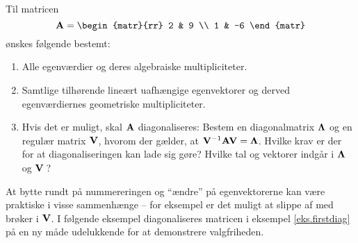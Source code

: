 \begin{exercise}
Til matricen
\begin{equation}
\mA = \begin{matr}{rr} 2 & 9 \\ 1 & -6 \end{matr}
\end{equation}
ønskes følgende bestemt:
\begin{enumerate}
\item Alle egenværdier og deres algebraiske multipliciteter.
\item Samtlige tilhørende lineært uafhængige egenvektorer og derved egenværdiernes geometriske multipliciteter.
\item Hvis det er muligt, skal $ \mathbf{A} $ diagonaliseres: Bestem en diagonalmatrix $ \bm{\Lambda} $ og en regulær matrix $ \mathbf{V} $, hvorom der gælder, at $ \mathbf{V}^{-1}\mathbf{A} \mathbf{V} = \bm{\Lambda} $. Hvilke krav er der for at diagonaliseringen kan lade sig gøre? Hvilke tal og vektorer indgår i $ \bm{\Lambda} $ og $ \mathbf{V}\, $?
\end{enumerate}
\end{exercise}

At bytte rundt på nummereringen og ``ændre'' på egenvektorerne kan være praktiske i visse sammenhænge -- for eksempel er det muligt at slippe af med brøker i $ \mathbf{V} $. I følgende eksempel diagonaliseres matricen i eksempel \ref{eks.firstdiag} på en ny måde udelukkende for at demonstrere valgfriheden.

